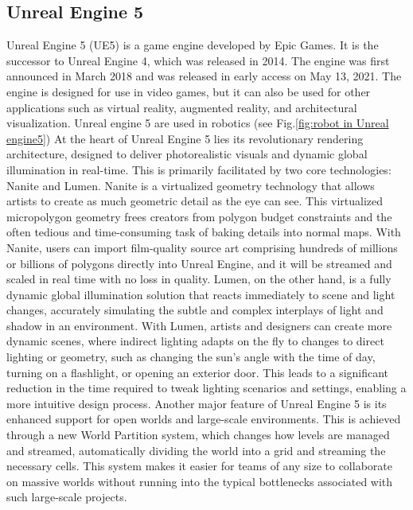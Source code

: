 \subsection{Unreal Engine 5}
\label{sec:Unreal Engine 5}
\singlespacing
Unreal Engine 5 (UE5) \cite{unreal2023engine}is a game engine developed by Epic Games. It is the successor to Unreal Engine 4, which was released in 2014. The engine was first announced in March 2018 and was released in early access on May 13, 2021. The engine is designed for use in video games, but it can also be used for other applications such as virtual reality, augmented reality, and architectural visualization. Unreal engine 5 are used in robotics (see Fig.\ref{fig:robot in Unreal engine5})
\singlespacing
At the heart of Unreal Engine 5 lies its revolutionary rendering architecture, designed to deliver photorealistic visuals and dynamic global illumination in real-time. This is primarily facilitated by two core technologies: Nanite and Lumen. Nanite is a virtualized geometry technology that allows artists to create as much geometric detail as the eye can see. This virtualized micropolygon geometry frees creators from polygon budget constraints and the often tedious and time-consuming task of baking details into normal maps. With Nanite, users can import film-quality source art comprising hundreds of millions or billions of polygons directly into Unreal Engine, and it will be streamed and scaled in real time with no loss in quality.
\singlespacing
Lumen, on the other hand, is a fully dynamic global illumination solution that reacts immediately to scene and light changes, accurately simulating the subtle and complex interplays of light and shadow in an environment. With Lumen, artists and designers can create more dynamic scenes, where indirect lighting adapts on the fly to changes to direct lighting or geometry, such as changing the sun's angle with the time of day, turning on a flashlight, or opening an exterior door. This leads to a significant reduction in the time required to tweak lighting scenarios and settings, enabling a more intuitive design process.
\singlespacing
Another major feature of Unreal Engine 5 is its enhanced support for open worlds and large-scale environments. This is achieved through a new World Partition system, which changes how levels are managed and streamed, automatically dividing the world into a grid and streaming the necessary cells. This system makes it easier for teams of any size to collaborate on massive worlds without running into the typical bottlenecks associated with such large-scale projects.
